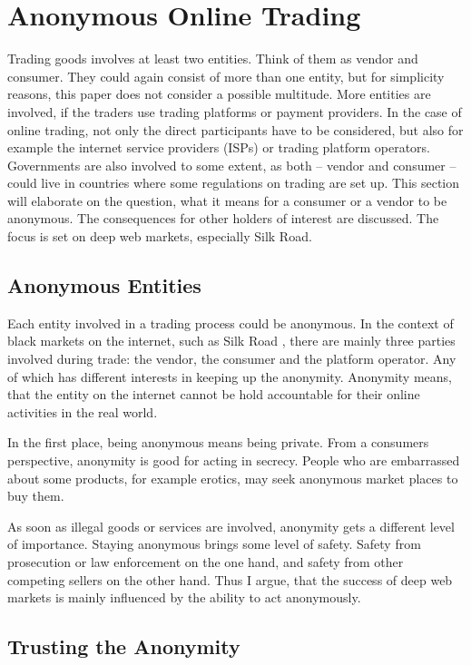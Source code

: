 \section{Anonymous Online Trading}
\label{trading}

Trading goods involves at least two entities. Think of them as vendor and consumer. They could again consist of more than one entity, but for simplicity reasons, this paper does not consider a possible multitude. More entities are involved, if the traders use trading platforms or payment providers. In the case of online trading, not only the direct participants have to be considered, but also for example the internet service providers (ISPs) or trading platform operators. Governments are also involved to some extent, as both -- vendor and consumer -- could live in countries where some regulations on trading are set up.
This section will elaborate on the question, what it means for a consumer or a vendor to be anonymous. The consequences for other holders of interest are discussed. The focus is set on deep web markets, especially Silk Road.

\subsection{Anonymous Entities}

Each entity involved in a trading process could be anonymous. In the context of black markets on the internet, such as Silk Road \cite{silkroad2013}, there are mainly three parties involved during trade: the vendor, the consumer and the platform operator. Any of which has different interests in keeping up the anonymity. Anonymity means, that the entity on the internet cannot be hold accountable for their online activities in the real world\cite{accountability2014}.

In the first place, being anonymous means being private. From a consumers perspective, anonymity is good for acting in secrecy. People who are embarrassed about some products, for example erotics, may seek anonymous market places to buy them.

As soon as illegal goods or services are involved, anonymity gets a different level of importance. Staying anonymous brings some level of safety. Safety from prosecution or law enforcement on the one hand, and safety from other competing sellers on the other hand. Thus I argue, that the success of deep web markets is mainly influenced by the ability to act anonymously.


\subsection{Trusting the Anonymity}

